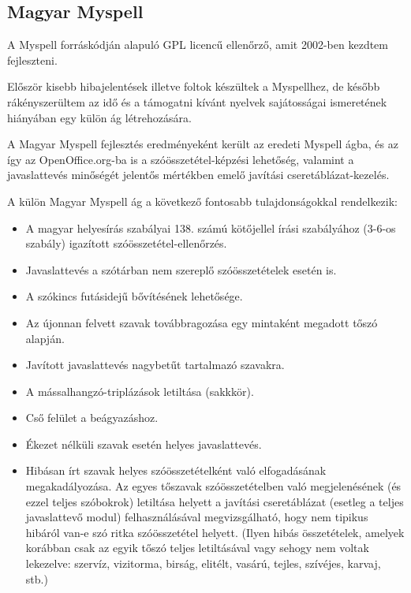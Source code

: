 \subsection{Magyar Myspell}

A Myspell forráskódján alapuló GPL licencű ellenőrző,
amit 2002-ben kezdtem fejleszteni.

Először kisebb hibajelentések illetve foltok
készültek a Myspellhez, de később rákényszerültem
az idő és a támogatni kívánt nyelvek sajátosságai
ismeretének hiányában egy külön ág létrehozására.

A Magyar Myspell fejlesztés eredményeként került az eredeti
Myspell ágba, és az így az OpenOffice.org-ba is
a szóösszetétel-képzési lehetőség,
valamint a javaslattevés minőségét jelentős
mértékben emelő javítási cseretáblázat-kezelés.

A külön Magyar Myspell ág a következő fontosabb
tulajdonságokkal rendelkezik:

\begin{itemize}
\item A magyar helyesírás szabályai 138. számú
kötőjellel írási szabályához (3-6-os szabály) igazított
szóösszetétel-ellenőrzés.

\item Javaslattevés a szótárban nem szereplő
szóösszetételek esetén is.

\item A szókincs futásidejű bővítésének lehetősége.

\item Az újonnan felvett szavak továbbragozása egy
mintaként megadott tőszó alapján.

\item Javított javaslattevés nagybetűt tartalmazó szavakra.

\item A mássalhangzó-triplázások letiltása (sakkkör).

\item Cső felület a beágyazáshoz.

\item Ékezet nélküli szavak esetén helyes javaslattevés.

\item Hibásan írt szavak helyes szóösszetételként
való elfogadásának megakadályozása. Az egyes tőszavak
szóösszetételben való megjelenésének (és ezzel teljes
szóbokrok) letiltása helyett a javítási cseretáblázat
(esetleg a teljes javaslattevő modul)
felhasználásával megvizsgálható, hogy nem tipikus
hibáról van-e szó ritka szóösszetétel helyett.
(Ilyen hibás összetételek, amelyek korábban csak az egyik
tőszó teljes letiltásával vagy sehogy nem voltak
lekezelve: szervíz, vizitorma, birság, elitélt, vasárú,
tejles, szívéjes, karvaj, stb.)

\end{itemize}

